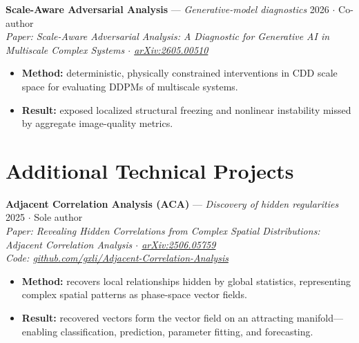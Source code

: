 \documentclass[10pt]{article}
\newcommand{\projtitle}[1]{{\fontsize{9.5}{11.4}\selectfont #1}}
\begin{document}
\projtitle{\textbf{Scale-Aware Adversarial Analysis} --- \textit{Generative-model diagnostics}}
\hfill{\footnotesize\color{contactgray!70} 2026 $\cdot$ Co-author}\\[2pt]
{\fontsize{6.5}{7.8}\selectfont\color{contactgray!50}\itshape Paper: Scale-Aware Adversarial Analysis: A
Diagnostic for Generative AI in Multiscale Complex Systems $\cdot$
\href{https://arxiv.org/abs/2605.00510}{arXiv:2605.00510}}
\begin{itemize}
  \item \textbf{Method:} deterministic, physically constrained interventions in CDD scale space for
        evaluating DDPMs of multiscale systems.
  \item \textbf{Result:} exposed localized structural freezing and nonlinear instability missed by
        aggregate image-quality metrics.
\end{itemize}

\newpage

\section*{Additional Technical Projects}

\projtitle{\textbf{Adjacent Correlation Analysis (ACA)} --- \textit{Discovery of hidden regularities}}
\hfill{\footnotesize\color{contactgray!70} 2025 $\cdot$ Sole author}\\[2pt]
{\fontsize{6.5}{7.8}\selectfont\color{contactgray!50}\itshape Paper: Revealing Hidden Correlations from Complex
Spatial Distributions: Adjacent Correlation Analysis $\cdot$
\href{https://arxiv.org/abs/2506.05759}{arXiv:2506.05759}\\
Code: \href{https://github.com/gxli/Adjacent-Correlation-Analysis}{github.com/gxli/Adjacent-Correlation-Analysis}}
\begin{itemize}
  \item \textbf{Method:} recovers local relationships hidden by global statistics, representing
        complex spatial patterns as phase-space vector fields.
  \item \textbf{Result:} recovered vectors form the vector field on an attracting manifold---
        enabling classification, prediction, parameter fitting, and forecasting.
\end{itemize}
\end{document}
